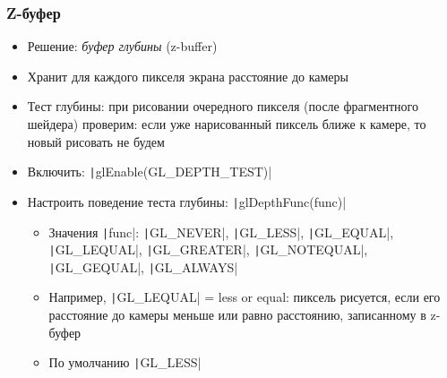 \documentclass[10pt]{beamer}
\begin{document}
\begin{frame}[fragile]
\frametitle{Z-буфер}
\begin{itemize}
\item Решение: \textit{буфер глубины} (z-buffer)
\pause
\item Хранит для каждого пикселя экрана расстояние до камеры
\pause
\item Тест глубины: при рисовании очередного пикселя (после фрагментного шейдера) проверим: если уже нарисованный пиксель ближе к камере, то новый рисовать не будем
\pause
\item Включить: \texttt|glEnable(GL_DEPTH_TEST)|
\pause
\item Настроить поведение теста глубины: \texttt|glDepthFunc(func)|
\begin{itemize}
\item Значения \texttt|func|: \texttt|GL_NEVER|, \texttt|GL_LESS|, \texttt|GL_EQUAL|, \texttt|GL_LEQUAL|, \texttt|GL_GREATER|, \texttt|GL_NOTEQUAL|, \texttt|GL_GEQUAL|, \texttt|GL_ALWAYS|
\pause
\item Например, \texttt|GL_LEQUAL| = less or equal: пиксель рисуется, если его расстояние до камеры меньше или равно расстоянию, записанному в z-буфер
\pause
\item По умолчанию \texttt|GL_LESS|
\end{itemize}
\end{itemize}
\end{frame}
\end{document}
